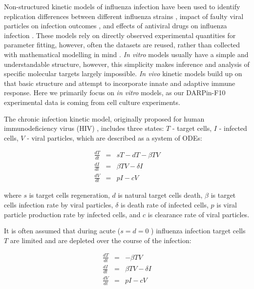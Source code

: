 Non-structured kinetic models of influenza infection have been used to identify replication differences between different influenza strains \cite{simon2016avian}, impact of faulty viral particles on infection outcomes \cite{frensing2013continuous}, and effects of antiviral drugs on influenza infection \cite{beauchemin2008modeling, handel2007neuraminidase, holder2011assessing}. These models rely on directly observed experimental quantities for parameter fitting, however, often the datasets are reused, rather than collected with mathematical modelling in mind \cite{boianelli2015modeling}. \textit{In vitro} models usually have a simple and understandable structure, however, this simplicity makes inference and analysis of specific molecular targets largely impossible. \textit{In vivo} kinetic models build up on that basic structure and attempt to incorporate innate \cite{beauchemin2008modeling, handel2010towards,miao2010quantifying} and adaptive \cite{belz2002compromised, handel2010towards, miao2010quantifying} immune response. Here we primarily focus on \textit{in vitro} models, as our DARPin-F10 experimental data is coming from cell culture experiments.

The chronic infection kinetic model, originally proposed for human immunodeficiency virus (HIV) \cite{perelson2002modelling}, includes three states: $T$ - target cells, $I$ - infected cells, $V$ - viral particles, which are described as a system of ODEs:

\begin{equation}
\begin{array}{rcl}
\frac{dT}{dt} &=& s T - d T - \beta T V \\
\frac{dI}{dt} &=& \beta T V - \delta I \\
\frac{dV}{dt} &=& p I - c V
\end{array}
\end{equation}

where $s$ is target cells regeneration, $d$ is natural target cells death, $\beta$ is target cells infection rate by viral particles, $\delta$ is death rate of infected cells, $p$ is viral particle production rate by infected cells, and $c$ is clearance rate of viral particles.

It is often assumed that during acute ($s = d = 0$ \cite{baccam2006kinetics}) influenza infection target cells $T$ are limited and are depleted over the course of the infection:

\begin{equation}
\begin{array}{rcl}
\frac{dT}{dt} &=& - \beta T V \\
\frac{dI}{dt} &=& \beta T V - \delta I \\
\frac{dV}{dt} &=& p I - c V
\end{array}
\end{equation}

